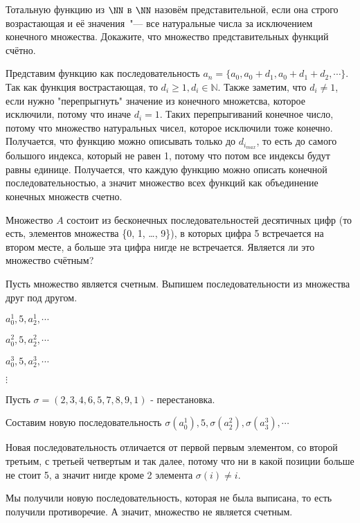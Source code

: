 \documentclass[11pt]{article}
\begin{document}
	\p Тотальную функцию из $\NN$ в $\NN$ назовём представительной, если она строго возрастающая и её значения~"--- все натуральные числа за исключением конечного множества. Докажите, что множество представительных  функций счётно.
	
	Представим функцию как последовательность $a_n = \{a_0, a_0 + d_1, a_0 + d_1 + d_2, \cdots\}$. Так как функция вострастающая, то $d_i  \geq 1, d_i \in \mathbb{N}$. Также заметим, что $d_i \neq 1$, если нужно "перепрыгнуть" \space значение из конечного множетсва, которое исключили, потому что иначе $d_i = 1$. Таких перепрыгиваний конечное число, потому что множество натуральных чисел, которое исключили тоже конечно. Получается, что функцию можно описывать только до $d_{i_{max}}$, то есть до самого большого индекса, который не равен 1, потому что потом все индексы будут равны единице. Получается, что каждую функцию можно описать конечной последовательностью, а значит множество всех функций как объединение конечных множеств счетно. 
		
	\p Множество $A$ состоит из бесконечных последовательностей десятичных цифр (то есть,  элементов множества \{0, 1, \ldots, 9\}), в которых цифра 5 встречается на втором месте, а больше эта цифра нигде не встречается. Является ли это множество счётным?
	
	Пусть множество является счетным. Выпишем последовательности из множества друг под другом. 
	
	$a_0^1, 5, a_2^1, \cdots$
	
	$a_0^2, 5, a_2^2, \cdots$
	
	$a_0^3, 5, a_2^3, \cdots$
	
	$\vdots$
	
	Пусть $\sigma = (2,3,4,6,5,7,8,9,1)$ - перестановка. 
	
	Составим новую последовательность $\sigma(a_0^1), 5, \sigma(a_2^2), \sigma(a_3^3), \cdots$
	
	Новая последовательность отличается от первой первым элементом, со второй третьим, с третьей четвертым и так далее, потому что ни в какой позиции больше не стоит 5, а значит нигде кроме 2 элемента $\sigma(i) \neq i$.
	
	Мы получили новую последовательность, которая не была выписана, то есть получили противоречие. А значит, множество не является счетным. 
\end{document}
